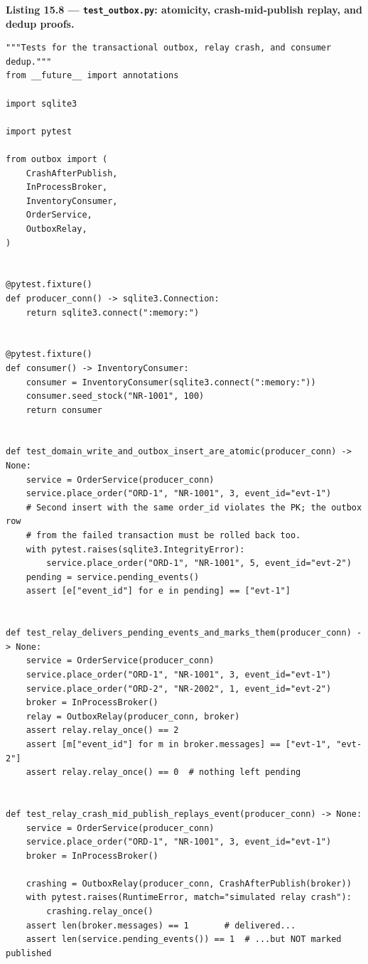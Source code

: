 \noindent\textbf{Listing 15.8 --- \texttt{test\_outbox.py}:
atomicity, crash-mid-publish replay, and dedup proofs.}
\label{lst:ch15-outbox-tests}
\begin{verbatim}
"""Tests for the transactional outbox, relay crash, and consumer dedup."""
from __future__ import annotations

import sqlite3

import pytest

from outbox import (
    CrashAfterPublish,
    InProcessBroker,
    InventoryConsumer,
    OrderService,
    OutboxRelay,
)


@pytest.fixture()
def producer_conn() -> sqlite3.Connection:
    return sqlite3.connect(":memory:")


@pytest.fixture()
def consumer() -> InventoryConsumer:
    consumer = InventoryConsumer(sqlite3.connect(":memory:"))
    consumer.seed_stock("NR-1001", 100)
    return consumer


def test_domain_write_and_outbox_insert_are_atomic(producer_conn) -> None:
    service = OrderService(producer_conn)
    service.place_order("ORD-1", "NR-1001", 3, event_id="evt-1")
    # Second insert with the same order_id violates the PK; the outbox row
    # from the failed transaction must be rolled back too.
    with pytest.raises(sqlite3.IntegrityError):
        service.place_order("ORD-1", "NR-1001", 5, event_id="evt-2")
    pending = service.pending_events()
    assert [e["event_id"] for e in pending] == ["evt-1"]


def test_relay_delivers_pending_events_and_marks_them(producer_conn) -> None:
    service = OrderService(producer_conn)
    service.place_order("ORD-1", "NR-1001", 3, event_id="evt-1")
    service.place_order("ORD-2", "NR-2002", 1, event_id="evt-2")
    broker = InProcessBroker()
    relay = OutboxRelay(producer_conn, broker)
    assert relay.relay_once() == 2
    assert [m["event_id"] for m in broker.messages] == ["evt-1", "evt-2"]
    assert relay.relay_once() == 0  # nothing left pending


def test_relay_crash_mid_publish_replays_event(producer_conn) -> None:
    service = OrderService(producer_conn)
    service.place_order("ORD-1", "NR-1001", 3, event_id="evt-1")
    broker = InProcessBroker()

    crashing = OutboxRelay(producer_conn, CrashAfterPublish(broker))
    with pytest.raises(RuntimeError, match="simulated relay crash"):
        crashing.relay_once()
    assert len(broker.messages) == 1       # delivered...
    assert len(service.pending_events()) == 1  # ...but NOT marked published


\end{verbatim}
